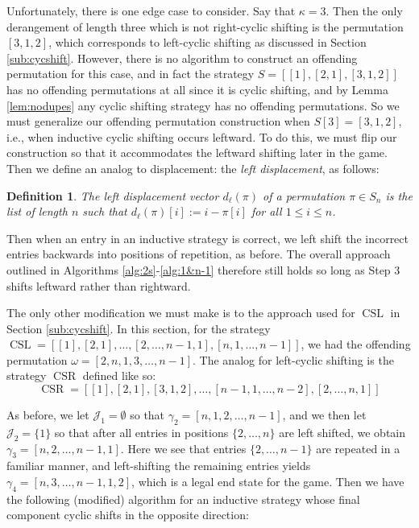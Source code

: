 \documentclass[article]{amsart}
\theoremstyle{plain}
\newtheorem{definition}[theorem]{Definition}
\DeclareMathOperator{\CSL}{CSL}
\DeclareMathOperator{\CSR}{CSR}
\begin{document}
Unfortunately, there is one edge case to consider. Say that $\kappa = 3$. Then the only derangement of length three which is not right-cyclic shifting is the permutation $[3,1,2]$, which corresponds to left-cyclic shifting as discussed in Section \ref{sub:cycshift}. However, there is no algorithm to construct an offending permutation for this case, and in fact the strategy $S = [[1],[2,1],[3,1,2]]$ has no offending permutations at all since it is cyclic shifting, and by Lemma \ref{lem:nodupes} any cyclic shifting strategy has no offending permutations. So we must generalize our offending permutation construction when $S[3] = [3,1,2]$, i.e., when inductive cyclic shifting occurs leftward. To do this, we must flip our construction so that it accommodates the leftward shifting later in the game. Then we define an analog to displacement: the \textit{left displacement}, as follows:

\begin{definition} \label{def:leftdisp}
    The left displacement vector $d_\ell(\pi)$ of a permutation $\pi \in S_n$ is the list of length $n$ such that $d_\ell(\pi)[i] := i - \pi[i]$ for all $1 \leq i \leq n$.  
\end{definition}

Then when an entry in an inductive strategy is correct, we left shift the incorrect entries backwards into positions of repetition, as before. The overall approach outlined in Algorithms \ref{alg:2s}-\ref{alg:1&n-1} therefore still holds so long as Step 3 shifts leftward rather than rightward. 

The only other modification we must make is to the approach used for $\CSL$ in Section \ref{sub:cycshift}. In this section, for the strategy $\CSL = [[1],[2,1], \dots, [2,\dots, n-1,1], [n,1,\dots, n-1]]$, we had the offending permutation $\omega = [2,n,1,3,\dots,n-1]$. The analog for left-cyclic shifting is the strategy $\CSR$ defined like so: 
\[ \CSR = [[1],[2,1],[3,1,2],\dots,[n-1,1,\dots,n-2],[2,\dots,n,1]]\] 

As before, we let $\mathcal{J}_1 = \emptyset$ so that $\gamma_2 = [n,1,2,\dots,n-1]$, and we then let $\mathcal{J}_2 = \{1\}$ so that after all entries in positions $\{2,\dots,n\}$ are left shifted, we obtain $\gamma_3 = [n,2,\dots, n-1,1]$. Here we see that entries $\{2,\dots,n-1\}$ are repeated in a familiar manner, and left-shifting the remaining entries yields $\gamma_4 = [n,3,\dots,n-1,1,2]$, which is a legal end state for the game. Then we have the following (modified) algorithm for an inductive strategy whose final component cyclic shifts in the opposite direction:
\end{document}

